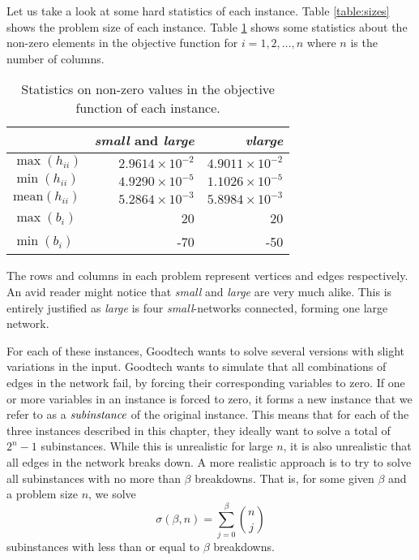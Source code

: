 Let us take a look at some hard statistics of each instance.
Table \ref{table:sizes} shows the problem size of each instance.
Table \ref{table:maxmin} shows some statistics about the non-zero elements in
the objective function for $i = 1,2,\ldots,n$ where $n$ is the number of
columns.
\begin{table}[ht!]
    \centering
    \caption{Statistics on non-zero values in the objective function of
each instance.}

    \begin{tabular}{lrr}
      & \textit{small} and \textit{large}         & \textit{vlarge} \\\hline
    $\max(h_{ii})$      & $2.9614 \times 10^{-2}$ & $4.9011 \times 10^{-2}$ \\
    $\min(h_{ii})$      & $4.9290 \times 10^{-5}$ & $1.1026 \times 10^{-5}$ \\
$\textrm{mean}(h_{ii})$ & $5.2864 \times 10^{-3}$ & $5.8984 \times 10^{-3}$ \\
    $\max(b_{i})$       & 20                      & 20 \\
    $\min(b_{i})$       & -70                     & -50 \\
    \end{tabular}
    \label{table:maxmin}
\end{table}
The rows and columns in each problem represent vertices and edges respectively.
An avid reader might notice that \textit{small} and \textit{large} are very
much alike.
This is entirely justified as \textit{large} is four \textit{small}-networks
connected, forming one large network.

For each of these instances, Goodtech wants to solve several versions
with slight variations in the input.
Goodtech wants to simulate that all combinations of edges in the network
fail, by forcing their corresponding variables to zero.
If one or more variables in an instance is forced to zero, it forms a new
instance that we refer to as a $\emph{subinstance}$ of the original instance.
This means that for each of the three instances described in this chapter,
they ideally want to solve a total of $2^n - 1$ subinstances. While this is
unrealistic for large $n$, it is also unrealistic that all edges in the
network breaks down.
A more realistic approach is to try to solve all subinstances with no more than
$\beta$ breakdowns.
That is, for some given $\beta$ and a problem size $n$, we solve
\begin{equation}
\sigma(\beta, n) = \sum_{j=0}^\beta {\binom{n}{j}}
\end{equation}
subinstances with less than or equal to $\beta$ breakdowns.
